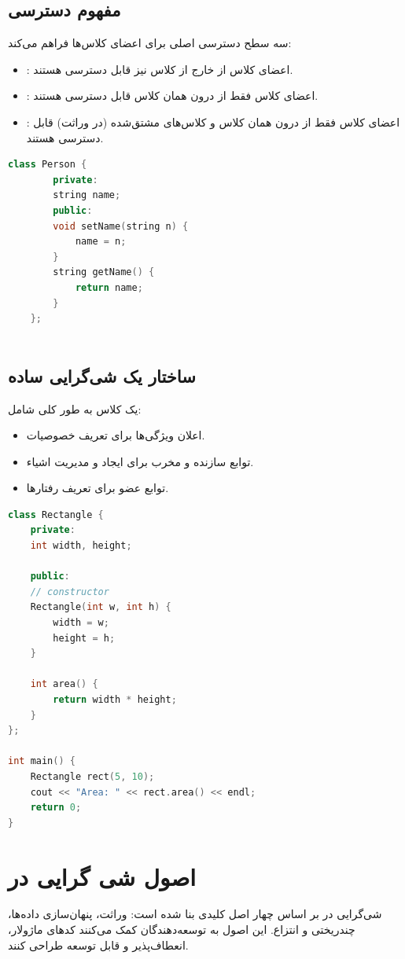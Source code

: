 \documentclass[12pt, a4paper]{report}
\begin{document}
\subsection{مفهوم دسترسی}
 سه سطح دسترسی اصلی برای اعضای کلاس‌ها فراهم می‌کند:
\begin{itemize}
	\item {} : اعضای کلاس از خارج از کلاس نیز قابل دسترسی هستند.
	\item {} : اعضای کلاس فقط از درون همان کلاس قابل دسترسی هستند.
	\item {} :  اعضای کلاس فقط از درون همان کلاس و کلاس‌های مشتق‌شده (در وراثت) قابل دسترسی هستند.
\end{itemize}

\LTR
\begin{lstlisting}[language=C++, breaklines=true]
	class Person {
		private:
		string name; 
		public:
		void setName(string n) { 
			name = n;
		}
		string getName() {
			return name;
		}
	};
	
\end{lstlisting}
\RTL

\subsection{ ساختار یک شی‌گرایی ساده}
یک کلاس به طور کلی شامل:
\begin{itemize}
	\item اعلان ویژگی‌ها برای تعریف خصوصیات.
	\item توابع سازنده و مخرب برای ایجاد و مدیریت اشیاء.
	\item توابع عضو برای تعریف رفتارها.
\end{itemize}
\LTR
\begin{lstlisting}[language=C++, breaklines=true]
class Rectangle {
	private:
	int width, height;
	
	public:
	// constructor
	Rectangle(int w, int h) {
		width = w;
		height = h;
	}
	
	int area() {
		return width * height;
	}
};

int main() {
	Rectangle rect(5, 10); 
	cout << "Area: " << rect.area() << endl; 
	return 0;
}

\end{lstlisting}
\RTL

\section{اصول شی گرایی در }
شی‌گرایی در  بر اساس چهار اصل کلیدی بنا شده است: وراثت، پنهان‌سازی داده‌ها، چندریختی و انتزاع. این اصول به توسعه‌دهندگان کمک می‌کنند کدهای ماژولار، انعطاف‌پذیر و قابل توسعه طراحی کنند.
\end{document}
